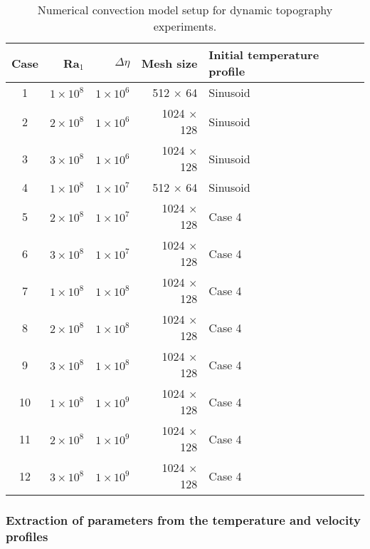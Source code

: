 \begin{table}
\centering
\caption{Numerical convection model setup for dynamic topography experiments.\label{tab:aspect}}
\footnotesize
\begin{tabular}{@{} c r r r l @{}}
\toprule
Case & Ra$_1$ & $\Delta \eta$ & Mesh size & Initial temperature profile \\
\midrule

1 & $1 \times 10^8$ & $1 \times 10^6$ & 512 $\times$ 64 & Sinusoid \\
2 & $2 \times 10^8$ & $1 \times 10^6$ & 1024 $\times$ 128 & Sinusoid \\
3 & $3 \times 10^8$ & $1 \times 10^6$ & 1024 $\times$ 128 & Sinusoid \\

4 & $1 \times 10^8$ & $1 \times 10^7$ & 512 $\times$ 64 & Sinusoid \\
5 & $2 \times 10^8$ & $1 \times 10^7$ & 1024 $\times$ 128 & Case 4 \\
6 & $3 \times 10^8$ & $1 \times 10^7$ & 1024 $\times$ 128 & Case 4 \\

7 & $1 \times 10^8$ & $1 \times 10^8$ & 1024 $\times$ 128 & Case 4 \\
8 & $2 \times 10^8$ & $1 \times 10^8$ & 1024 $\times$ 128 & Case 4 \\
9 & $3 \times 10^8$ & $1 \times 10^8$ & 1024 $\times$ 128 & Case 4 \\

10 & $1 \times 10^8$ & $1 \times 10^9$ & 1024 $\times$ 128 & Case 4 \\
11 & $2 \times 10^8$ & $1 \times 10^9$ & 1024 $\times$ 128 & Case 4 \\
12 & $3 \times 10^8$ & $1 \times 10^9$ & 1024 $\times$ 128 & Case 4 \\

\bottomrule
\end{tabular}
\end{table}

\subsubsection{Extraction of parameters from the temperature and velocity profiles}  \label{sec:T_retrieval}



